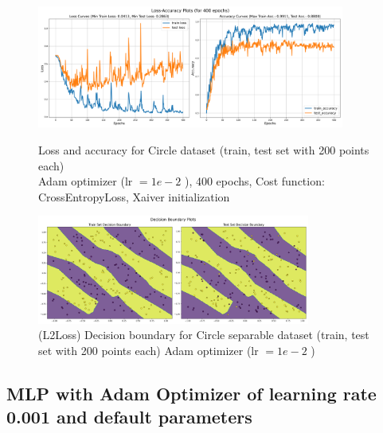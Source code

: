 \begin{solve}
\begin{figure}[H]
    \centering
    \includegraphics[width=0.9\textwidth]{plots/sinusoid_adam-lr1e-2_more_paramsloss_acc.png}
    \caption{Loss and accuracy for Circle dataset (train, test set with 200 points each)\\ Adam optimizer (lr $=1e-2$ ), 400 epochs, Cost function: CrossEntropyLoss, Xaiver initialization}
    \includegraphics[width=0.8\textwidth]{plots/sinusoid_adam-lr1e-2_more_paramsboundary.png}
    \caption{(L2Loss) Decision boundary for Circle separable dataset (train, test set with 200 points each) 
    Adam optimizer (lr $=1e-2$ )}
\end{figure}

\subsection{MLP with Adam Optimizer of learning rate 0.001 and default parameters}


\end{solve}
